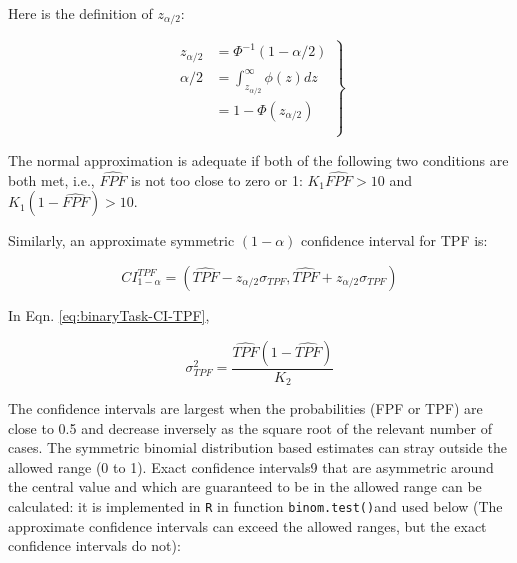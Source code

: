 \documentclass[
]{book}
\begin{document}
Here is the definition of \(z_{\alpha/2}\):

\begin{equation} 
\left.
\begin{aligned} 
z_{\alpha/2} &=\Phi^{-1}\left ( 1-\alpha/2 \right )\\
\alpha/2&=\int_{z_{\alpha/2}}^{\infty}\phi(z)dz\\ 
&= 1-\Phi(z_{\alpha/2})\\
\\
\end{aligned}
\right \} 
\label{eq:binaryTask-def-z-alpha2}
\end{equation}

The normal approximation is adequate if both of the following two conditions are both met, i.e., \(\widehat{FPF}\) is not too close to zero or 1: \(K_1\widehat{FPF} > 10\) and \(K_1(1-\widehat{FPF}) > 10\).

Similarly, an approximate symmetric \((1-\alpha)\) confidence interval for TPF is:

\begin{equation} 
CI_{1-\alpha}^{TPF}=\left ( \widehat{TPF} - z_{\alpha/2} \sigma_{TPF}, \widehat{TPF} + z_{\alpha/2} \sigma_{TPF} \right )
\label{eq:binaryTask-CI-TPF}
\end{equation}

In Eqn. \eqref{eq:binaryTask-CI-TPF},

\begin{equation} 
\sigma_{TPF}^2 = \frac{\widehat{TPF}\left ( 1 - \widehat{TPF} \right )}{K_2}
\label{eq:binaryTask-Var-TPF}
\end{equation}

The confidence intervals are largest when the probabilities (FPF or TPF) are close to 0.5 and decrease inversely as the square root of the relevant number of cases. The symmetric binomial distribution based estimates can stray outside the allowed range (0 to 1). Exact confidence intervals9 that are asymmetric around the central value and which are guaranteed to be in the allowed range can be calculated: it is implemented in \texttt{R} in function \texttt{binom.test()}and used below (The approximate confidence intervals can exceed the allowed ranges, but the exact confidence intervals do not):
\end{document}
